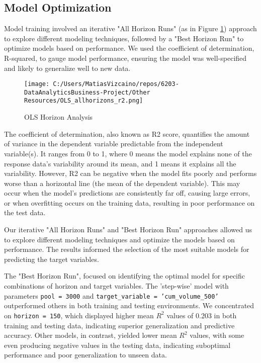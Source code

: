 \documentclass{article}
\begin{document}
\subsection{Model Optimization}\label{sec:model-optimization}

Model training involved an iterative "All Horizon Runs" (as in Figure \ref{fig:ols-all-horizons}) approach to explore different modeling techniques, followed by a "Best Horizon Run" to optimize models based on performance. We used the coefficient of determination, R-squared, to gauge model performance, ensuring the model was well-specified and likely to generalize well to new data. 

\begin{figure}[htbp]
  \centering
  \texttt{[image: C:/Users/MatiasVizcaino/repos/6203-DataAnalyticsBusiness-Project/Other Resources/OLS\_allhorizons\_r2.png]}
  \caption{OLS Horizon Analysis}
  \label{fig:ols-all-horizons}
\end{figure}

The coefficient of determination, also known as R2 score, quantifies the amount of variance in the dependent variable predictable from the independent variable(s). It ranges from 0 to 1, where 0 means the model explains none of the response data's variability around its mean, and 1 means it explains all the variability. However, R2 can be negative when the model fits poorly and performs worse than a horizontal line (the mean of the dependent variable). This may occur when the model's predictions are consistently far off, causing large errors, or when overfitting occurs on the training data, resulting in poor performance on the test data.

Our iterative "All Horizon Runs" and "Best Horizon Run" approaches allowed us to explore different modeling techniques and optimize the models based on performance. The results informed the selection of the most suitable models for predicting the target variables.

The "Best Horizon Run", focused on identifying the optimal model for specific combinations of horizon and target variables. The 'step-wise' model with parameters \texttt{pool = 3000} and \texttt{target\_variable = 'cum\_volume\_500'} outperformed others in both training and testing environments. We concentrated on \texttt{horizon = 150}, which displayed higher mean $R^2$ values of 0.203 in both training and testing data, indicating superior generalization and predictive accuracy. Other models, in contrast, yielded lower mean $R^2$ values, with some even producing negative values in the testing data, indicating suboptimal performance and poor generalization to unseen data.
\end{document}
